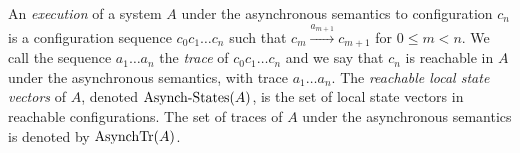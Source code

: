 An \emph{execution} of a system $A$ under the asynchronous semantics to configuration ${c}_n$
is a configuration sequence ${c}_0 {c}_1 \ldots {c}_n$ such that
$  {c}_m \xrightarrow{a_{m+1}} {c}_{m+1}$
for $0 \le m < n$. We call
the sequence $a_1 \ldots a_n$ the \emph{trace} of ${c}_0 {c}_1 \ldots
{c}_n$ and we say that ${c}_n$ is reachable in $A$ under the asynchronous semantics, with trace $a_1\ldots a_n$. The \emph{reachable local state vectors} of $A$, denoted $\mathrm{Asynch}\text{-}\mathrm{States}(A)$, is the
set of local state vectors in reachable configurations.
%
The set of traces of $A$ under the asynchronous semantics is denoted by $\mathrm{AsynchTr}({A})$.




